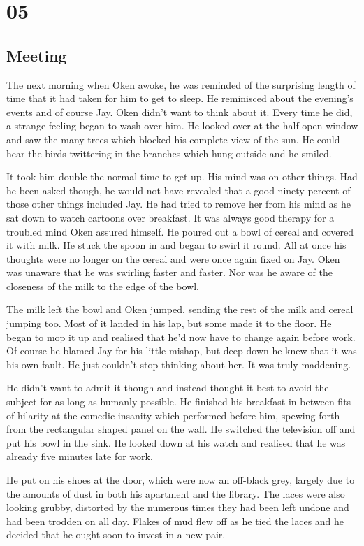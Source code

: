 \chapter{05}
\section{Meeting}


The next morning when Oken awoke, he was reminded of the surprising length of time that it had taken for him to get to sleep.  He reminisced about the evening's events and of course Jay.  Oken didn't want to think about it.  Every time he did, a strange feeling began to wash over him.  He looked over at the half open window and saw the many trees which blocked his complete view of the sun.  He could hear the birds twittering in the branches which hung outside and he smiled.

It took him double the normal time to get up.  His mind was on other things.  Had he been asked though, he would not have revealed that a good ninety percent of those other things included Jay.  He had tried to remove her from his mind as he sat down to watch cartoons over breakfast.  It was always good therapy for a troubled mind Oken assured himself.  He poured out a bowl of cereal and covered it with milk.  He stuck the spoon in and began to swirl it round.  All at once his thoughts were no longer on the cereal and were once again fixed on Jay.  Oken was unaware that he was swirling faster and faster.  Nor was he aware of the closeness of the milk to the edge of the bowl.

The milk left the bowl and Oken jumped, sending the rest of the milk and cereal jumping too.  Most of it landed in his lap, but some made it to the floor.  He began to mop it up and realised that he'd now have to change again before work. Of course he blamed Jay for his little mishap, but deep down he knew that it was his own fault.  He just couldn't stop thinking about her.  It was truly maddening.

He didn't want to admit it though and instead thought it best to avoid the subject for as long as humanly possible.  He finished his breakfast in between fits of hilarity at the comedic insanity which performed before him, spewing forth from the rectangular shaped panel on the wall.  He switched the television off and put his bowl in the sink.  He looked down at his watch and realised that he was already five minutes late for work.  

He put on his shoes at the door, which were now an off-black grey, largely due to the amounts of dust in both his apartment and the library.  The laces were also looking grubby, distorted by the numerous times they had been left undone and had been trodden on all day.  Flakes of mud flew off as he tied the laces and he decided that he ought soon to invest in a new pair.  

